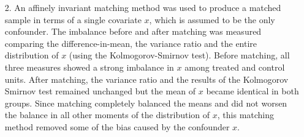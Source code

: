 \documentclass{article}
\begin{document}
\begin{itemize}
    \item[2.]  An affinely invariant matching method was used to
      produce a matched sample in terms of a single covariate $x$, which
      is assumed to be the only confounder. The imbalance before and
      after matching was measured comparing the difference-in-mean,
      the variance ratio and the entire distribution of $x$ (using the
      Kolmogorov-Smirnov test). Before matching, all three measures
      showed a strong imbalance in $x$ among treated and control
      units. After matching, the variance ratio and the results of the
      Kolmogorov Smirnov test remained unchanged but the mean of $x$
      became identical in both groups. Since matching completely
      balanced the means and did not worsen the balance in all other
      moments of the distribution of $x$, this matching method removed
      some of the bias caused by the confounder $x$.


%



\end{itemize}
\end{document}

